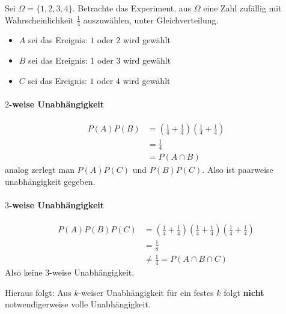 \begin{example}
Sei $\Omega = \{1,2,3,4\}$. Betrachte das Experiment, aus $\Omega$ eine Zahl zufällig mit Wahrscheinlichkeit $\frac{1}{4}$ %
auszuwählen, unter Gleichverteilung.
\begin{itemize}
	\item $A$ sei das Ereignis: $1$ oder $2$ wird gewählt
	\item $B$ sei das Ereignis: $1$ oder $3$ wird gewählt
	\item $C$ sei das Ereignis: $1$ oder $4$ wird gewählt
\end{itemize}
\paragraph*{$2$-weise Unabhängigkeit}
\begin{align*}
P(A) P(B) &= \left( \frac{1}{4} + \frac{1}{4} \right)\left( \frac{1}{4} + \frac{1}{4} \right) \\
&=\frac{1}{4} \\
&= P(A\cap B)
\end{align*}
analog zerlegt man $P(A)P(C)$ und $P(B)P(C)$. Also ist paarweise unabhängigkeit gegeben.
\paragraph*{$3$-weise Unabhängigkeit}
\begin{align*}
P(A) P(B) P(C)&= \left( \frac{1}{4} + \frac{1}{4} \right)\left( \frac{1}{4} + \frac{1}{4} \right)\left( \frac{1}{4} + \frac{1}{4} \right) \\
&=\frac{1}{8} \\
&\neq \frac{1}{4} = P(A\cap B \cap C)
\end{align*}
Also keine $3$-weise Unabhängigkeit.
\end{example}

Hieraus folgt: Aus $k$-weiser Unabhängigkeit für ein festes $k$ folgt \textbf{nicht} notwendigerweise volle Unabhängigkeit. 

